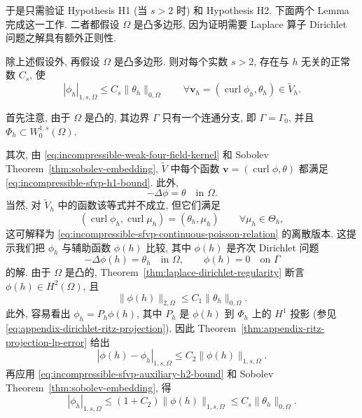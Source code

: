 于是只需验证 Hypothesis H1 (当 $s>2$ 时) 和 Hypothesis H2.
下面两个 Lemma 完成这一工作.
二者都假设 $\Omega$ 是凸多边形,
因为证明需要 Laplace 算子 Dirichlet 问题之解具有额外正则性.

\begin{Lemma}\label{lem:incompressible-sfvp-hypothesis-h1}
除上述假设外, 再假设 $\Omega$ 是凸多边形.
则对每个实数 $s>2$, 存在与 $h$ 无关的正常数 $C_s$, 使
\begin{equation}\label{eq:incompressible-sfvp-h1-bound}
|\phi_h|_{1,s,\Omega}
\leq C_s\|\theta_h\|_{0,\Omega}
\qquad
\forall\mathbf v_h=(\operatorname{curl}\phi_h,\theta_h)
\in\widetilde V_h.
\end{equation}
\end{Lemma}

\begin{Proof}
首先注意, 由于 $\Omega$ 是凸的, 其边界 $\Gamma$
只有一个连通分支, 即 $\Gamma=\Gamma_0$, 并且
$\Phi_h\subset W_0^{1,s}(\Omega)$.

其次, 由 \eqref{eq:incompressible-weak-four-field-kernel}
和 Sobolev Theorem~\ref{thm:sobolev-embedding},
$\widetilde V$ 中每个函数
$\mathbf v=(\operatorname{curl}\phi,\theta)$
都满足 \eqref{eq:incompressible-sfvp-h1-bound}.
此外,
\begin{equation}\label{eq:incompressible-sfvp-continuous-poisson-relation}
-\Delta\phi=\theta\quad\text{in }\Omega.
\end{equation}
当然, 对 $\widetilde V_h$ 中的函数该等式并不成立,
但它们满足
\[
(\operatorname{curl}\phi_h,\operatorname{curl}\mu_h)
=(\theta_h,\mu_h)
\qquad\forall\mu_h\in\Theta_h,
\]
这可解释为 \eqref{eq:incompressible-sfvp-continuous-poisson-relation}
的离散版本. 这提示我们把 $\phi_h$ 与辅助函数 $\phi(h)$ 比较,
其中 $\phi(h)$ 是齐次 Dirichlet 问题
\[
-\Delta\phi(h)=\theta_h\quad\text{in }\Omega,
\qquad
\phi(h)=0\quad\text{on }\Gamma
\]
的解.
由于 $\Omega$ 是凸的, Theorem~\ref{thm:laplace-dirichlet-regularity}
断言 $\phi(h)\in H^2(\Omega)$, 且
\begin{equation}\label{eq:incompressible-sfvp-auxiliary-h2-bound}
\|\phi(h)\|_{2,\Omega}
\leq C_1\|\theta_h\|_{0,\Omega}.
\end{equation}
此外, 容易看出 $\phi_h=P_h\phi(h)$,
其中 $P_h$ 是 $\phi(h)$ 到 $\Phi_h$ 上的 $H^1$ 投影
(参见 \eqref{eq:appendix-dirichlet-ritz-projection}).
因此 Theorem~\ref{thm:appendix-ritz-projection-lp-error} 给出
\[
|\phi(h)-\phi_h|_{1,s,\Omega}
\leq C_2\|\phi(h)\|_{1,s,\Omega}.
\]
再应用 \eqref{eq:incompressible-sfvp-auxiliary-h2-bound}
和 Sobolev Theorem~\ref{thm:sobolev-embedding}, 得
\[
|\phi_h|_{1,s,\Omega}
\leq(1+C_2)\|\phi(h)\|_{1,s,\Omega}
\leq C_s\|\theta_h\|_{0,\Omega}.
\]
\end{Proof}

